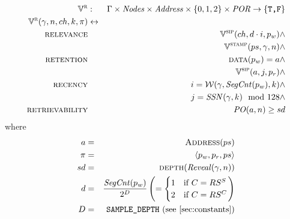 \begin{definition}
\label{def:por-validation}
%
\begin{eqnarray}
\mathbb{V}^{\textsc{r}}&:&\Gamma\times\mathit{Nodes}\times\mathit{Address}\times\{0,1,2\}\times\mathit{POR}\to\{\texttt{T,F}\}\\
\mathbb{V}^{\textsc{r}}(\gamma, n, ch, k, \pi)&\leftrightarrow& \\
\textsc{relevance}&&\mathbb{V}^{\textsc{sip}}(ch,d\cdot i,p_w)\land\\
    && \mathbb{V}^{\textsc{stamp}}(ps, \gamma, n) \land\\
\textsc{retention}&& \textsc{data}(p_w)=a\land\\
    && \mathbb{V}^{\textsc{sip}}(a,j,p_r)\land\\
\textsc{recency}&&i=\mathcal{W}(\gamma,\mathit{SegCnt}(p_w),k)\land\\
    &&j = \mathit{SSN}(\gamma,k)\mod 128\land\\
\textsc{retrievability}&&\mathit{PO}(a,n) \geq sd 
\end{eqnarray}
where
\begin{eqnarray}
a&=& \textsc{Address}(ps)\\
\pi&=&\langle p_w, p_r, ps\rangle\\
sd &=& \textsc{depth}(\mathit{Reveal}(\gamma, n))\\
d&=&\frac{\mathit{SegCnt}(p_w)}{2^D}\left(=\begin{cases}
    1& \text{if } C=RS^S\\
2 &\text{if } C=RS^C
\end{cases}\right)\\
D& =& \texttt{SAMPLE\_DEPTH} \text{ (see \ref{sec:constants})}
\end{eqnarray}
\end{definition}


